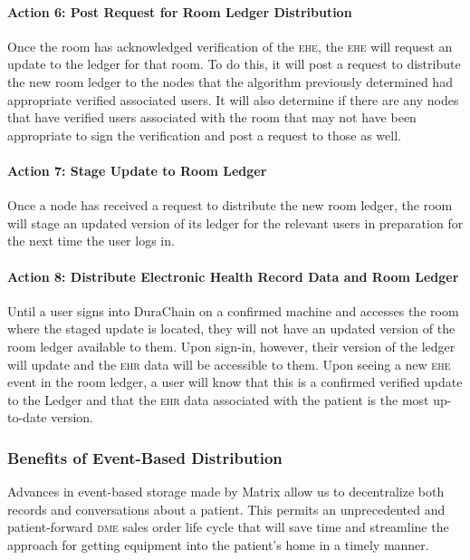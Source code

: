     \paragraph{Action 6: Post Request for Room Ledger Distribution}
    Once the room has acknowledged verification of the \textsc{ehe}, the \textsc{ehe} will request an update to the ledger for that room. To do this, it will post a request to distribute the new room ledger to the nodes that the algorithm previously determined had appropriate verified associated users. It will also determine if there are any nodes that have verified users associated with the room that may not have been appropriate to sign the verification and post a request to those as well.%

    \paragraph{Action 7: Stage Update to Room Ledger}
    Once a node has received a request to distribute the new room ledger, the room will stage an updated version of its ledger for the relevant users in preparation for the next time the user logs in.%

    \paragraph{Action 8: Distribute Electronic Health Record Data and Room Ledger}
    Until a user signs into DuraChain on a confirmed machine and accesses the room where the staged update is located, they will not have an updated version of the room ledger available to them. Upon sign-in, however, their version of the ledger will update and the \textsc{ehr} data will be accessible to them. Upon seeing a new \textsc{ehe} event in the room ledger, a user will know that this is a confirmed verified update to the Ledger and that the \textsc{ehr} data associated with the patient is the most up-to-date version.%

  \subsubsection{Benefits of Event-Based Distribution}
  Advances in event-based storage made by Matrix allow us to decentralize both records and conversations about a patient. This permits an unprecedented and patient-forward \textsc{dme} sales order life cycle that will save time and streamline the approach for getting equipment into the patient's home in a timely manner.%

